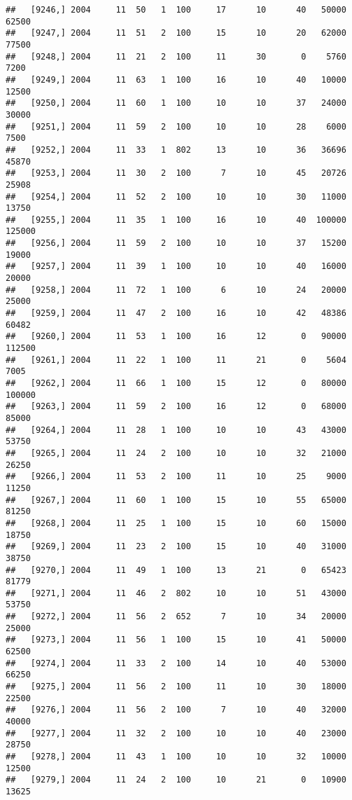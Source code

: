 \documentclass{article}\usepackage[]{graphicx}\usepackage[]{color}
\makeatletter
\newenvironment{kframe}{%
 \def\at@end@of@kframe{}%
 \ifinner\ifhmode%
  \def\at@end@of@kframe{\end{minipage}}%
  \begin{minipage}{\columnwidth}%
 \fi\fi%
 \def\FrameCommand##1{\hskip\@totalleftmargin \hskip-\fboxsep
 \colorbox{shadecolor}{##1}\hskip-\fboxsep
     \hskip-\linewidth \hskip-\@totalleftmargin \hskip\columnwidth}%
 \MakeFramed {\advance\hsize-\width
   \@totalleftmargin\z@ \linewidth\hsize
   \@setminipage}}%
 {\par\unskip\endMakeFramed%
 \at@end@of@kframe}
\newenvironment{knitrout}{}{} %
\makeatother
\begin{document}
\begin{knitrout}
\begin{kframe}
\begin{verbatim}
##   [9246,] 2004     11  50   1  100     17      10      40   50000   62500
##   [9247,] 2004     11  51   2  100     15      10      20   62000   77500
##   [9248,] 2004     11  21   2  100     11      30       0    5760    7200
##   [9249,] 2004     11  63   1  100     16      10      40   10000   12500
##   [9250,] 2004     11  60   1  100     10      10      37   24000   30000
##   [9251,] 2004     11  59   2  100     10      10      28    6000    7500
##   [9252,] 2004     11  33   1  802     13      10      36   36696   45870
##   [9253,] 2004     11  30   2  100      7      10      45   20726   25908
##   [9254,] 2004     11  52   2  100     10      10      30   11000   13750
##   [9255,] 2004     11  35   1  100     16      10      40  100000  125000
##   [9256,] 2004     11  59   2  100     10      10      37   15200   19000
##   [9257,] 2004     11  39   1  100     10      10      40   16000   20000
##   [9258,] 2004     11  72   1  100      6      10      24   20000   25000
##   [9259,] 2004     11  47   2  100     16      10      42   48386   60482
##   [9260,] 2004     11  53   1  100     16      12       0   90000  112500
##   [9261,] 2004     11  22   1  100     11      21       0    5604    7005
##   [9262,] 2004     11  66   1  100     15      12       0   80000  100000
##   [9263,] 2004     11  59   2  100     16      12       0   68000   85000
##   [9264,] 2004     11  28   1  100     10      10      43   43000   53750
##   [9265,] 2004     11  24   2  100     10      10      32   21000   26250
##   [9266,] 2004     11  53   2  100     11      10      25    9000   11250
##   [9267,] 2004     11  60   1  100     15      10      55   65000   81250
##   [9268,] 2004     11  25   1  100     15      10      60   15000   18750
##   [9269,] 2004     11  23   2  100     15      10      40   31000   38750
##   [9270,] 2004     11  49   1  100     13      21       0   65423   81779
##   [9271,] 2004     11  46   2  802     10      10      51   43000   53750
##   [9272,] 2004     11  56   2  652      7      10      34   20000   25000
##   [9273,] 2004     11  56   1  100     15      10      41   50000   62500
##   [9274,] 2004     11  33   2  100     14      10      40   53000   66250
##   [9275,] 2004     11  56   2  100     11      10      30   18000   22500
##   [9276,] 2004     11  56   2  100      7      10      40   32000   40000
##   [9277,] 2004     11  32   2  100     10      10      40   23000   28750
##   [9278,] 2004     11  43   1  100     10      10      32   10000   12500
##   [9279,] 2004     11  24   2  100     10      21       0   10900   13625

\end{verbatim}
\end{kframe}
\end{knitrout}
\end{document}
